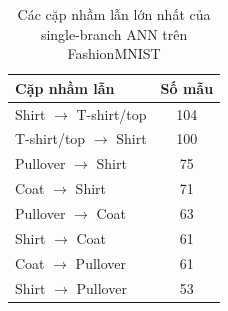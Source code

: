 \begin{table}[H]
\centering
\caption{Các cặp nhầm lẫn lớn nhất của single-branch ANN trên FashionMNIST}
\label{tab:fashion-mnist-top-errors}
\begin{tabular}{l c}
\toprule
Cặp nhầm lẫn & Số mẫu \\
\midrule
Shirt $\rightarrow$ T-shirt/top & 104 \\
T-shirt/top $\rightarrow$ Shirt & 100 \\
Pullover $\rightarrow$ Shirt & 75 \\
Coat $\rightarrow$ Shirt & 71 \\
Pullover $\rightarrow$ Coat & 63 \\
Shirt $\rightarrow$ Coat & 61 \\
Coat $\rightarrow$ Pullover & 61 \\
Shirt $\rightarrow$ Pullover & 53 \\
\bottomrule
\end{tabular}
\end{table}
